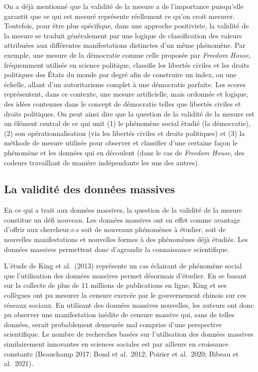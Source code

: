 \documentclass[
  letterpaper,
  DIV=11,
  numbers=noendperiod]{scrreprt}
\begin{document}
On a déjà mentionné que la validité de la mesure a de l'importance
puisqu'elle garantit que ce qui est mesuré représente réellement ce
qu'on croit mesurer. Toutefois, pour être plus spécifique, dans une
approche positiviste, la validité de la mesure se traduit généralement
par une logique de classification des valeurs attribuées aux différentes
manifestations distinctes d'un même phénomène. Par exemple, une mesure
de la démocratie comme celle proposée par \emph{Freedom House},
fréquemment utilisée en science politique, classifie les libertés
civiles et les droits politiques des États du monde par degré afin de
construire un index, ou une échelle, allant d'un autoritarisme complet à
une démocratie parfaite. Les scores représentent, dans ce contexte, une
mesure artificielle, mais ordonnée et logique, des idées contenues dans
le concept de démocratie telles que libertés civiles et droits
politiques. On peut ainsi dire que la question de la validité de la
mesure est un élément central de ce qui unit (1) le phénomène social
étudié (la démocratie), (2) son opérationnalisation (via les libertés
civiles et droits politiques) et (3) la méthode de mesure utilisée pour
observer et classifier d'une certaine façon le phénomène et les données
qui en découlent (dans le cas de \emph{Freedom House}, des codeurs
travaillant de manière indépendante les uns des autres).

\subsection*{La validité des données
massives}\label{la-validituxe9-des-donnuxe9es-massives}

En ce qui a trait aux données massives, la question de la validité de la
mesure constitue un défi nouveau. Les données massives ont en effet
comme avantage d'offrir aux chercheur.e.s soit de nouveaux phénomènes à
étudier, soit de nouvelles manifestations et nouvelles formes à des
phénomènes déjà étudiés. Les données massives permettent donc d'agrandir
la connaissance scientifique.

L'étude de King et al.~(2013) représente un cas éclairant de phénomène
social que l'utilisation des données massives permet désormais
d'étudier. En se basant sur la collecte de plus de 11 millions de
publications en ligne, King et ses collègues ont pu mesurer la censure
exercée par le gouvernement chinois sur ces réseaux sociaux. En
utilisant des données massives nouvelles, les auteurs ont donc pu
observer une manifestation inédite de censure massive qui, sans de
telles données, serait probablement demeurée mal comprise d'une
perspective scientifique. Le nombre de recherches basées sur
l'utilisation des données massives similairement innovantes en sciences
sociales est par ailleurs en croissance constante (Beauchamp 2017; Bond
et al.~2012; Poirier et al.~2020; Bibeau et al.~2021).
\end{document}
